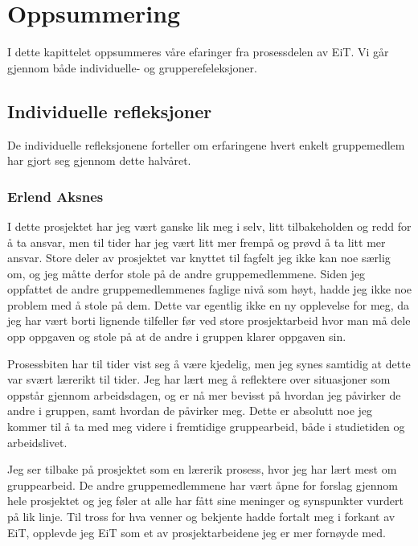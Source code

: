 \chapter{Oppsummering}
I dette kapittelet oppsummeres våre efaringer fra prosessdelen av EiT.
Vi går gjennom både individuelle- og grupperefeleksjoner.

\section{Individuelle refleksjoner}
\label{individuellerefleksjoner}
De individuelle refleksjonene forteller om erfaringene hvert enkelt gruppemedlem
har gjort seg gjennom dette halvåret.

\subsection*{Erlend Aksnes}
I dette prosjektet har jeg vært ganske lik meg i selv, litt tilbakeholden og redd for å ta ansvar, men til tider har jeg vært litt mer frempå og prøvd å ta litt mer ansvar. Store deler av prosjektet var knyttet til fagfelt jeg ikke kan noe særlig om, og jeg måtte derfor stole på de andre gruppemedlemmene. Siden jeg oppfattet de andre gruppemedlemmenes faglige nivå som høyt, hadde jeg ikke noe problem med å stole på dem. Dette var egentlig ikke en ny opplevelse for meg, da jeg har vært borti lignende tilfeller før ved store prosjektarbeid hvor man må dele opp oppgaven og stole på at de andre i gruppen klarer oppgaven sin. 

Prosessbiten har til tider vist seg å være kjedelig, men jeg synes samtidig at dette var svært lærerikt til tider. Jeg har lært meg å reflektere over situasjoner som oppstår gjennom arbeidsdagen, og er nå mer bevisst på hvordan jeg påvirker de andre i gruppen, samt hvordan de påvirker meg. Dette er absolutt noe jeg kommer til å ta med meg videre i fremtidige gruppearbeid, både i studietiden og arbeidslivet.

Jeg ser tilbake på prosjektet som en lærerik prosess, hvor jeg har lært mest om gruppearbeid. De andre gruppemedlemmene har vært åpne for forslag gjennom hele prosjektet og jeg føler at alle har fått sine meninger og synspunkter vurdert på lik linje. Til tross for hva venner og bekjente hadde fortalt meg i forkant av EiT, opplevde jeg EiT som et av prosjektarbeidene jeg er mer fornøyde med. 

